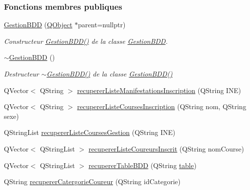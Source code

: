 \subsubsection*{Fonctions membres publiques}
\begin{DoxyCompactItemize}
\item 
\hyperlink{class_gestion_b_d_d_a406bdb9b1714b204fa6fab015baffc27}{Gestion\+B\+DD} (\hyperlink{class_q_object}{Q\+Object} $\ast$parent=nullptr)
\begin{DoxyCompactList}\small\item\em Constructeur \hyperlink{class_gestion_b_d_d_a406bdb9b1714b204fa6fab015baffc27}{Gestion\+B\+D\+D()} de la classe \hyperlink{class_gestion_b_d_d}{Gestion\+B\+DD}. \end{DoxyCompactList}\item 
\hyperlink{class_gestion_b_d_d_a4d98c4008182a5749c57c97772b3c303}{$\sim$\+Gestion\+B\+DD} ()
\begin{DoxyCompactList}\small\item\em Destructeur \hyperlink{class_gestion_b_d_d_a4d98c4008182a5749c57c97772b3c303}{$\sim$\+Gestion\+B\+D\+D()} de la classe \hyperlink{class_gestion_b_d_d_a406bdb9b1714b204fa6fab015baffc27}{Gestion\+B\+D\+D()} \end{DoxyCompactList}\item 
Q\+Vector$<$ Q\+String $>$ \hyperlink{class_gestion_b_d_d_a6c1ab5e51fbd6c92bb096badbeac0df5}{recuperer\+Liste\+Manifestations\+Inscription} (Q\+String I\+NE)
\item 
Q\+Vector$<$ Q\+String $>$ \hyperlink{class_gestion_b_d_d_a59ef29e28993c64aa4d5a8c42a8fb08d}{recuperer\+Liste\+Courses\+Inscription} (Q\+String nom, Q\+String sexe)
\item 
Q\+String\+List \hyperlink{class_gestion_b_d_d_ac35de40fd5860b3130f71788ecaa5ef3}{recuperer\+Liste\+Courses\+Gestion} (Q\+String I\+NE)
\item 
Q\+Vector$<$ Q\+String\+List $>$ \hyperlink{class_gestion_b_d_d_a09b547cb065256acd269c64e273c93fd}{recuperer\+Liste\+Coureurs\+Inscrit} (Q\+String nom\+Course)
\item 
Q\+Vector$<$ Q\+String\+List $>$ \hyperlink{class_gestion_b_d_d_a2b44ebc5bf5b1a7babde6512817a85b4}{recuperer\+Table\+B\+DD} (Q\+String \hyperlink{class_gestion_b_d_d_afa3e974fb5afa7f25f275a662e182960}{table})
\item 
Q\+String \hyperlink{class_gestion_b_d_d_ad7b0117ad5d55f21e6f00858038f4a85}{recuperer\+Catergorie\+Coureur} (Q\+String id\+Categorie)
\item 

\end{DoxyCompactItemize}
